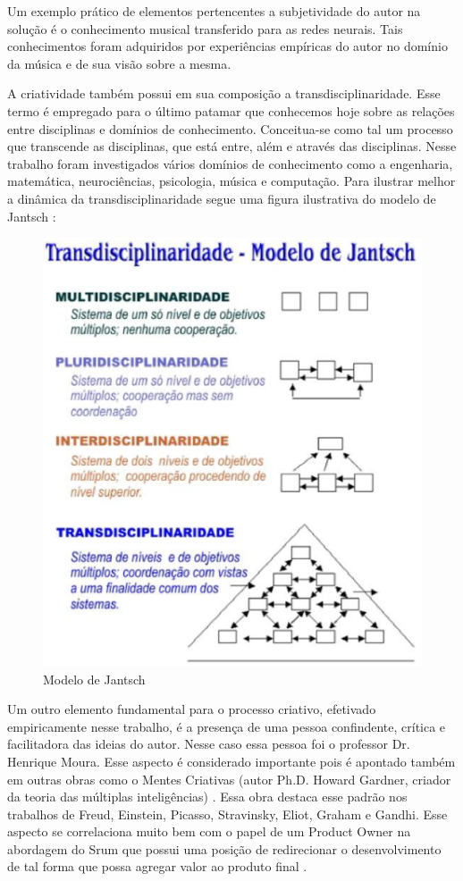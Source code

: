 Um exemplo prático de elementos pertencentes a subjetividade do autor na solução é o conhecimento musical transferido para as redes neurais. Tais conhecimentos foram adquiridos por experiências empíricas do autor no domínio da música e de sua visão sobre a mesma.

A criatividade também possui em sua composição a transdisciplinaridade. Esse termo é empregado para o último patamar que conhecemos hoje sobre as relações entre disciplinas e domínios de conhecimento. Conceitua-se como tal um processo que transcende as disciplinas, que está entre, além e através das disciplinas. Nesse trabalho foram investigados vários domínios de conhecimento como a engenharia, matemática, neurociências, psicologia, música e computação. Para ilustrar melhor a dinâmica da transdisciplinaridade segue uma figura ilustrativa do modelo de Jantsch \cite{jantsh}:

\begin{figure}[h]
	\centering
		\includegraphics[keepaspectratio=true,scale=0.7]{figuras/trans.eps}
	\caption{Modelo de Jantsch}
\end{figure}

Um outro elemento fundamental para o processo criativo, efetivado empiricamente nesse trabalho, é a presença de uma pessoa confindente, crítica e facilitadora das ideias do autor. Nesse caso essa pessoa foi o professor Dr. Henrique Moura. Esse aspecto é considerado importante pois é apontado também em outras obras como o Mentes Criativas (autor Ph.D. Howard Gardner, criador da teoria das múltiplas inteligências) \cite{gardner}. Essa obra destaca esse padrão nos trabalhos de Freud, Einstein, Picasso, Stravinsky, Eliot, Graham e Gandhi. Esse aspecto se correlaciona muito bem com o papel de um Product Owner na abordagem do Srum que possui uma posição de redirecionar o desenvolvimento de tal forma que possa agregar valor ao produto final \cite{PO}.

